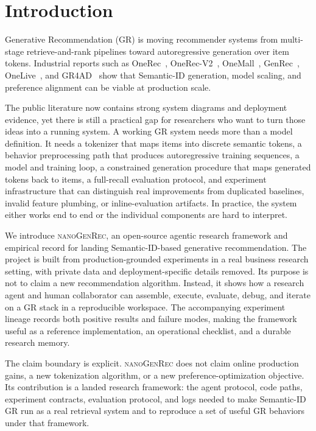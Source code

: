 \documentclass[11pt]{article}
\begin{document}
\section{Introduction}

Generative Recommendation (GR) is moving recommender systems from multi-stage retrieve-and-rank pipelines toward autoregressive generation over item tokens. Industrial reports such as OneRec~\citep{onerec}, OneRec-V2~\citep{onerecv2}, OneMall~\citep{onemall}, GenRec~\citep{genrec}, OneLive~\citep{onelive}, and GR4AD~\citep{gr4ad} show that Semantic-ID generation, model scaling, and preference alignment can be viable at production scale.

The public literature now contains strong system diagrams and deployment evidence, yet there is still a practical gap for researchers who want to turn those ideas into a running system. A working GR system needs more than a model definition. It needs a tokenizer that maps items into discrete semantic tokens, a behavior preprocessing path that produces autoregressive training sequences, a model and training loop, a constrained generation procedure that maps generated tokens back to items, a full-recall evaluation protocol, and experiment infrastructure that can distinguish real improvements from duplicated baselines, invalid feature plumbing, or inline-evaluation artifacts. In practice, the system either works end to end or the individual components are hard to interpret.

We introduce \textsc{nanoGenRec}, an open-source agentic research framework and empirical record for landing Semantic-ID-based generative recommendation. The project is built from production-grounded experiments in a real business research setting, with private data and deployment-specific details removed. Its purpose is not to claim a new recommendation algorithm. Instead, it shows how a research agent and human collaborator can assemble, execute, evaluate, debug, and iterate on a GR stack in a reproducible workspace. The accompanying experiment lineage records both positive results and failure modes, making the framework useful as a reference implementation, an operational checklist, and a durable research memory.

The claim boundary is explicit. \textsc{nanoGenRec} does not claim online production gains, a new tokenization algorithm, or a new preference-optimization objective. Its contribution is a landed research framework: the agent protocol, code paths, experiment contracts, evaluation protocol, and logs needed to make Semantic-ID GR run as a real retrieval system and to reproduce a set of useful GR behaviors under that framework.
\end{document}
